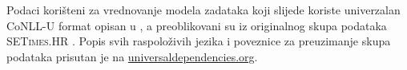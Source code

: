 Podaci korišteni za vrednovanje modela zadataka koji slijede koriste univerzalan
CoNLL-U format opisan u \citep{univdeps12}, a preoblikovani su iz originalnog skupa
podataka \textsc{SETimes.HR} \citep{agic2014setimes}. Popis svih raspoloživih
jezika i poveznice za preuzimanje skupa podataka prisutan je na
\href{http://universaldependencies.org/}{universaldependencies.org}.
